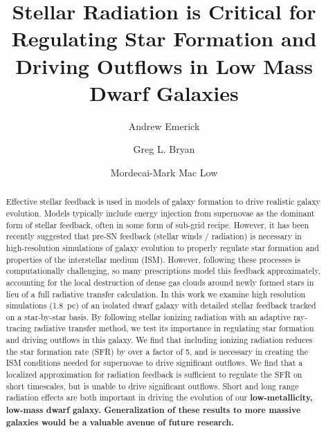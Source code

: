 \documentclass[twocolumn]{aastex62}
\begin{document}
\title{Stellar Radiation is Critical for Regulating Star Formation and Driving Outflows in Low Mass Dwarf Galaxies}


\author{Andrew Emerick}

\author{Greg L. Bryan}

\author{Mordecai-Mark Mac Low}

\nocollaboration



\begin{abstract}
%
%
%
%
Effective stellar feedback is used in models of galaxy formation to 
drive realistic galaxy evolution. Models typically include energy injection from supernovae as the dominant form of stellar feedback, often in some form of sub-grid recipe. However, it has been recently suggested that pre-SN feedback (stellar winds / radiation) is necessary in high-resolution simulations of galaxy evolution to properly regulate star formation and properties of the interstellar medium (ISM). However, following these processes is computationally challenging, 
so many prescriptions model this feedback approximately, accounting for the local destruction of dense gas clouds around newly formed stars in lieu of a full radiative transfer calculation. In this work we examine high resolution simulations (1.8~pc) of an isolated dwarf galaxy with detailed stellar feedback tracked on a star-by-star basis. By following stellar ionizing radiation with an adaptive ray-tracing radiative transfer method, we test its importance in regulating star formation and driving outflows in this galaxy. We find that including ionizing radiation reduces the star formation rate (SFR) by over a factor of 5, and is necessary in creating the ISM conditions needed for supernovae to drive significant outflows. We find that a localized approximation for radiation feedback is sufficient to regulate the SFR on short timescales, but is unable to drive significant outflows. Short and long range radiation effects are both important in driving the evolution of our \textbf{low-metallicity, low-mass dwarf galaxy. Generalization of these results to more massive galaxies would be a valuable avenue of future research.}
\end{abstract}
\end{document}
